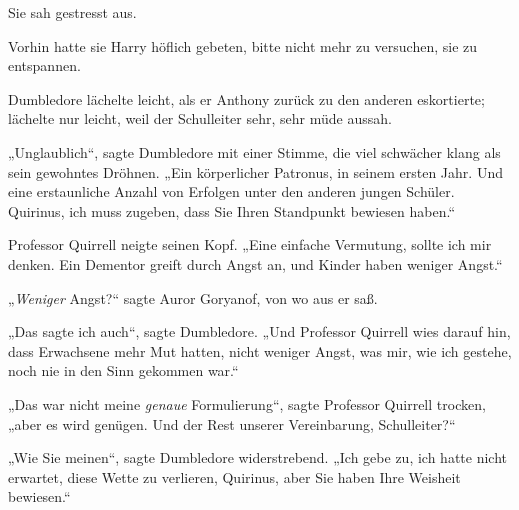 Sie sah gestresst aus.

Vorhin hatte sie Harry höflich gebeten, bitte nicht mehr zu versuchen, sie zu entspannen.

Dumbledore lächelte leicht, als er Anthony zurück zu den anderen eskortierte; lächelte nur leicht, weil der Schulleiter sehr, sehr müde aussah.

„Unglaublich“, sagte Dumbledore mit einer Stimme, die viel schwächer klang als sein gewohntes Dröhnen.
„Ein körperlicher Patronus, in seinem ersten Jahr. Und eine erstaunliche Anzahl von Erfolgen unter den anderen jungen Schüler. Quirinus, ich muss zugeben, dass Sie Ihren Standpunkt bewiesen haben.“

Professor Quirrell neigte seinen Kopf.
„Eine einfache Vermutung, sollte ich mir denken. Ein Dementor greift durch Angst an, und Kinder haben weniger Angst.“

„\emph{Weniger} Angst?“ sagte Auror Goryanof, von wo aus er saß.

„Das sagte ich auch“, sagte Dumbledore.
„Und Professor Quirrell wies darauf hin, dass Erwachsene mehr Mut hatten, nicht weniger Angst, was mir, wie ich gestehe, noch nie in den Sinn gekommen war.“

„Das war nicht meine \emph{genaue} Formulierung“, sagte Professor Quirrell trocken, „aber es wird genügen. Und der Rest unserer Vereinbarung, Schulleiter?“

„Wie Sie meinen“, sagte Dumbledore widerstrebend.
„Ich gebe zu, ich hatte nicht erwartet, diese Wette zu verlieren, Quirinus, aber Sie haben Ihre Weisheit bewiesen.“

